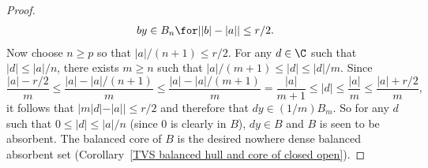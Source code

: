 \begin{proof}
\begin{align}\label{TVS Baire iff no nowhere dense balanced absorbent-3}
by\in B_n\for||b|-|a||\leq r/2.
\end{align}
Now choose $n\geq p$ so that $|a|/(n+1)\leq r/2$. For any $d\in\C$ such that $|d|\leq |a|/n$, there exists $m\geq n$ such that $|a|/(m+1)\leq|d|\leq|d|/m$. Since
\[\frac{|a|-r/2}{m}\leq\frac{|a|-|a|/(n+1)}{m}\leq\frac{|a|-|a|/(m+1)}{m}=\frac{|a|}{m+1}\leq |d|\leq\frac{|a|}{m}\leq\frac{|a|+r/2}{m},\]
it follows that $|m|d|-|a||\leq r/2$ and therefore that $d y\in (1/m)B_m$. So for any $d$ such that $0\leq|d|\leq |a|/n$ (since $0$ is clearly in $B$), $d y\in B$ and $B$ is seen to be absorbent. The balanced core of $B$ is the desired nowhere dense balanced absorbent set (Corollary~\ref{TVS balanced hull and core of closed open}).
\end{proof}
